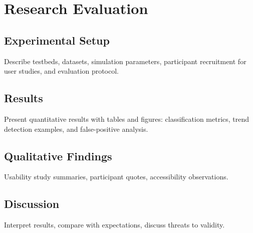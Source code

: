 \chapter{Research Evaluation}
\label{ch:eval}

\section{Experimental Setup}
\noindent Describe testbeds, datasets, simulation parameters, participant recruitment for user studies, and evaluation protocol.

\section{Results}
\noindent Present quantitative results with tables and figures: classification metrics, trend detection examples, and false-positive analysis.

\section{Qualitative Findings}
\noindent Usability study summaries, participant quotes, accessibility observations.

\section{Discussion}
\noindent Interpret results, compare with expectations, discuss threats to validity.
